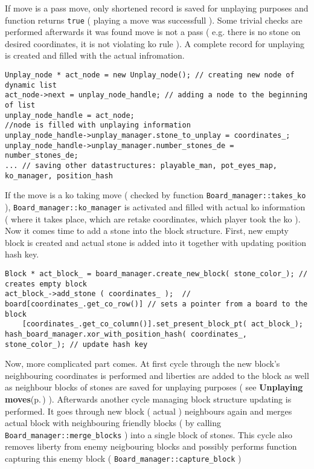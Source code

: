 If move is a pass move, only shortened record is saved for unplaying purposes and function returns {\tt true} ( playing a move was successfull ). Some trivial checks are performed afterwards it was found move is not a pass ( e.g. there is no stone on desired coordinates, it is not violating ko rule ). A complete record for unplaying is created and filled with the actual infromation.



\footnotesize\begin{verbatim}Unplay_node * act_node = new Unplay_node(); // creating new node of dynamic list 
act_node->next = unplay_node_handle; // adding a node to the beginning of list
unplay_node_handle = act_node;
//node is filled with unplaying information
unplay_node_handle->unplay_manager.stone_to_unplay = coordinates_;  
unplay_node_handle->unplay_manager.number_stones_de = number_stones_de;
... // saving other datastructures: playable_man, pot_eyes_map, ko_manager, position_hash
\end{verbatim}
\normalsize


If the move is a ko taking move ( checked by function {\tt Board\_\-manager::takes\_\-ko} ), {\tt Board\_\-manager::ko\_\-manager} is activated and filled with actual ko information ( where it takes place, which are retake coordinates, which player took the ko ). Now it comes time to add a stone into the block structure. First, new empty block is created and actual stone is added into it together with updating position hash key. 

\footnotesize\begin{verbatim}Block * act_block_ = board_manager.create_new_block( stone_color_); // creates empty block
act_block_->add_stone ( coordinates_ );  // 
board[coordinates_.get_co_row()] // sets a pointer from a board to the block
    [coordinates_.get_co_column()].set_present_block_pt( act_block_); 
hash_board_manager.xor_with_position_hash( coordinates_, stone_color_); // update hash key 
\end{verbatim}
\normalsize


Now, more complicated part comes. At first cycle through the new block's neighbouring coordinates is performed and liberties are added to the block as well as neighbour blocks of stones are saved for unplaying purposes ( see {\bf Unplaying moves}{\rm (p.\,\pageref{page_6_page_6__sec_4})} ). Afterwards another cycle managing block structure updating is performed. It goes through new block ( actual ) neighbours again and merges actual block with neighbouring friendly blocks ( by calling {\tt Board\_\-manager::merge\_\-blocks} ) into a single block of stones. This cycle also removes liberty from enemy neigbouring blocks and possibly performs function capturing this enemy block ( {\tt Board\_\-manager::capture\_\-block} ) 

